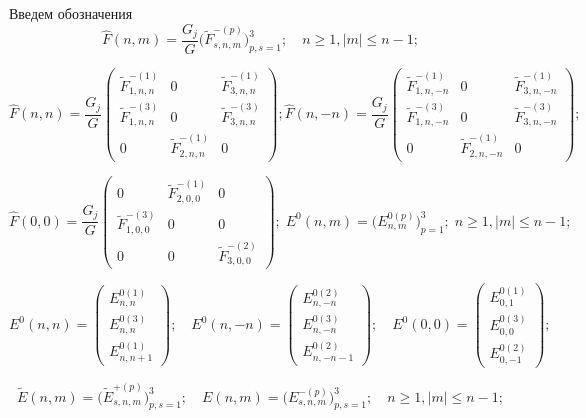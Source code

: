 Введем обозначения
$$
\hat F(n,m)=\frac{G_j}{G}\bigg(\tilde F_{s,n,m}^{-(p)}\bigg)_{p,s=1}^3;\quad n\ge 1, |m|\le n-1;
$$

\begin{equation*}
\hat F(n,n)=\frac{G_j}{G}
\begin{pmatrix}
\tilde F_{1,n,n}^{-(1)} & 0 & \tilde F_{3,n,n}^{-(1)} \\
\tilde F_{1,n,n}^{-(3)} & 0 & \tilde F_{3,n,n}^{-(3)} \\
0 & \tilde F_{2,n,n}^{-(1)} & 0
\end{pmatrix};
\hat F(n,-n)=\frac{G_j}{G}
\begin{pmatrix}
\tilde F_{1,n,-n}^{-(1)} & 0 & \tilde F_{3,n,-n}^{-(1)} \\
\tilde F_{1,n,-n}^{-(3)} & 0 & \tilde F_{3,n,-n}^{-(3)} \\
0 & \tilde F_{2,n,-n}^{-(1)} & 0
\end{pmatrix};
\end{equation*}

\begin{equation*}
\hat F(0,0)=\frac{G_j}{G}
\begin{pmatrix}
0 & \tilde F_{2,0,0}^{-(1)} & 0 \\
\tilde F_{1,0,0}^{-(3)} & 0 & 0 \\
0 & 0 & \tilde F_{3,0,0}^{-(2)}
\end{pmatrix};\;
E^0(n,m)=\bigg(E_{n,m}^{0(p)}\bigg)_{p=1}^3;\; n\ge 1, |m|\le n-1;
\end{equation*}

\begin{equation*}
E^0(n,n)=
\begin{pmatrix}
E_{n,n}^{0(1)} \\
E_{n,n}^{0(3)} \\
E_{n,n+1}^{0(1)}
\end{pmatrix};\quad
E^0(n,-n)=
\begin{pmatrix}
E_{n,-n}^{0(2)} \\
E_{n,-n}^{0(3)} \\
E_{n,-n-1}^{0(2)}
\end{pmatrix};\quad
E^0(0,0)=
\begin{pmatrix}
E_{0,1}^{0(1)} \\
E_{0,0}^{0(3)} \\
E_{0,-1}^{0(2)}
\end{pmatrix};
\end{equation*}

$$
\tilde E(n,m)=\bigg(\tilde E_{s,n,m}^{+(p)}\bigg)_{p,s=1}^3;\quad
E(n,m)=\bigg(E_{s,n,m}^{-(p)}\bigg)_{p,s=1}^3;\quad n\ge 1, |m|\le n-1;
$$

